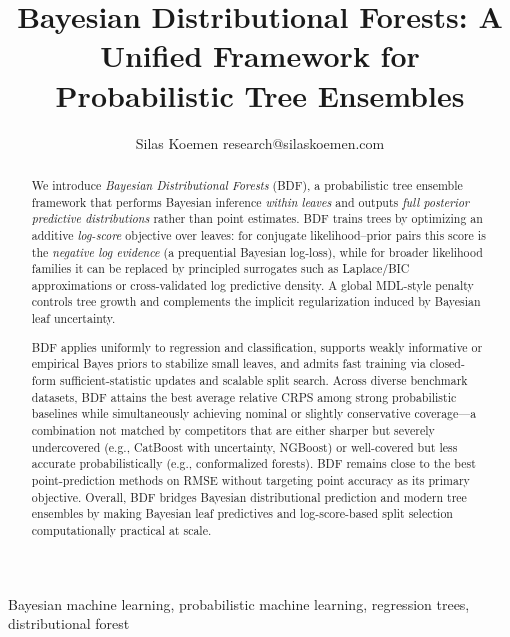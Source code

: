 \documentclass[twoside,11pt]{article}
\begin{document}
\title{Bayesian Distributional Forests: A Unified Framework for Probabilistic Tree Ensembles}

\author{\name Silas Koemen \email research@silaskoemen.com}

\maketitle

\begin{abstract}%
We introduce \emph{Bayesian Distributional Forests} (BDF), a probabilistic tree ensemble framework that performs Bayesian inference \emph{within leaves} and outputs \emph{full posterior predictive distributions} rather than point estimates.
BDF trains trees by optimizing an additive \emph{log-score} objective over leaves: for conjugate likelihood--prior pairs this score is the \emph{negative log evidence} (a prequential Bayesian log-loss), while for broader likelihood families it can be replaced by principled surrogates such as Laplace/BIC approximations or cross-validated log predictive density.
A global MDL-style penalty controls tree growth and complements the implicit regularization induced by Bayesian leaf uncertainty.

BDF applies uniformly to regression and classification, supports weakly informative or empirical Bayes priors to stabilize small leaves, and admits fast training via closed-form sufficient-statistic updates and scalable split search.
Across diverse benchmark datasets, BDF attains the best average relative CRPS among strong probabilistic baselines while simultaneously achieving nominal or slightly conservative coverage---a combination not matched by competitors that are either sharper but severely undercovered (e.g., CatBoost with uncertainty, NGBoost) or well-covered but less accurate probabilistically (e.g., conformalized forests). BDF remains close to the best point-prediction methods on RMSE without targeting point accuracy as its primary objective.
Overall, BDF bridges Bayesian distributional prediction and modern tree ensembles by making Bayesian leaf predictives and log-score-based split selection computationally practical at scale.
\end{abstract}

\begin{keywords}
  Bayesian machine learning, probabilistic machine learning, regression trees, distributional forest
\end{keywords}
\end{document}
